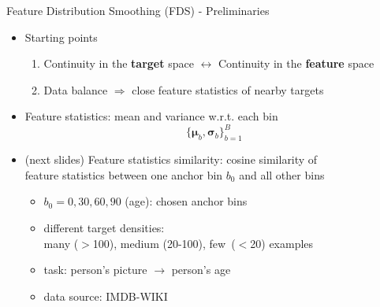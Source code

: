 \begin{frame}{Feature Distribution Smoothing (FDS) - Preliminaries}
	\begin{itemize}\setlength\itemsep{1.5em}
		\item<2-> Starting points
		\begin{enumerate}
			\item<2-> Continuity in the \textbf{target} space $\longleftrightarrow$ Continuity in the \textbf{feature} space
			\item<3-> Data balance $\Longrightarrow$ close feature statistics of nearby targets
		\end{enumerate}
		\item<4-> Feature statistics: mean and variance w.r.t. each bin
		\begin{equation*}
			\{\bm{\mu}_b,\bm{\sigma}_b\}_{b=1}^B
		\end{equation*}
		\item<5-> (next slides) Feature statistics similarity: cosine similarity of \\feature statistics between one anchor bin $b_0$ and all other bins
		\begin{itemize}
			\item $b_0 = 0, 30, 60, 90$ (age): chosen anchor bins
			\item different target densities: \\many ($>$100), medium (20-100), few~($<$20) examples
			\item task: person's picture $\longrightarrow$ person's age
			\item data source: IMDB-WIKI
		\end{itemize}
	\end{itemize}
\end{frame}



